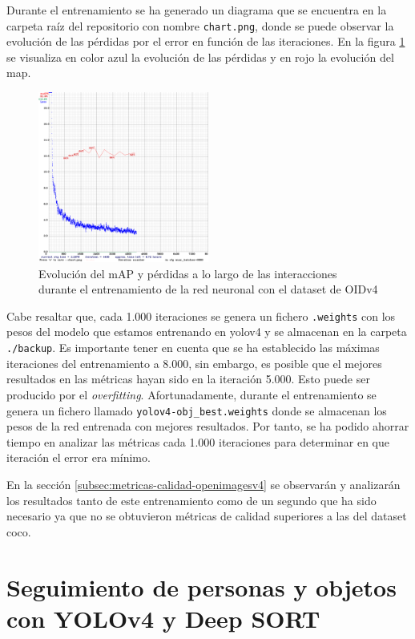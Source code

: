 Durante el entrenamiento se ha generado un diagrama que se encuentra en la carpeta raíz del repositorio con nombre \texttt{chart.png}, donde se puede observar la evolución de las pérdidas por el error en función de las iteraciones. En la figura \ref{fig:chart-train} se visualiza en color azul la evolución de las pérdidas y en rojo la evolución del \gls{map}.

\begin{figure}[ht]
\centering
\includegraphics[width=0.5\textwidth]{img/chapters/resultados/metricas/chart_train.png}
\caption{\label{fig:chart-train}Evolución del mAP y pérdidas a lo largo de las interacciones durante el entrenamiento de la red neuronal con el dataset de OIDv4}
\end{figure}

Cabe resaltar que, cada 1.000 iteraciones se genera un fichero \texttt{.weights} con los pesos del modelo que estamos entrenando en \gls{yolov4} y se almacenan en la carpeta \texttt{./backup}. Es importante tener en cuenta que se ha establecido las máximas iteraciones del entrenamiento a 8.000, sin embargo, es posible que el mejores resultados en las métricas hayan sido en la iteración 5.000. Esto puede ser producido por el \textit{overfitting}. Afortunadamente, durante el entrenamiento se genera un fichero llamado \texttt{yolov4-obj\_best.weights} donde se almacenan los pesos de la red entrenada con mejores resultados. Por tanto, se ha podido ahorrar tiempo en analizar las métricas cada 1.000 iteraciones para determinar en que iteración el error era mínimo.

En la sección \ref{subsec:metricas-calidad-openimagesv4} se observarán y analizarán los resultados tanto de este entrenamiento como de un segundo que ha sido necesario ya que no se obtuvieron métricas de calidad superiores a las del dataset \gls{coco}.

\section{Seguimiento de personas y objetos con YOLOv4 y Deep SORT}
\label{sec:desarrollo-yolov4+deepsort}

